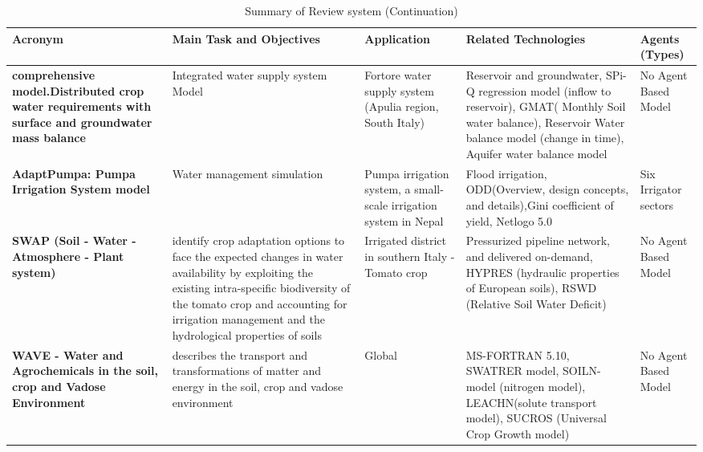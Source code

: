 \documentclass[letterpaper, 10 pt, conference]{ieeeconf}  %
\begin{document}
\newpage
\begin{table}[h]
\caption{Summary of Review system (Continuation)}
\label{table_summary1}
\begin{center}
\begin{tabular}{@{\hspace{0cm}}|p{2cm}|     @{\hspace{0cm}}|p{2cm}|   @{\hspace{0cm}} |p{4cm}|  @{\hspace{0cm}}|p{4cm}| @{\hspace{0cm}}|p{2cm}|}
\hline
\textbf{Acronym} & \textbf{Main Task and Objectives} & \textbf{Application} & \textbf{Related Technologies} & \textbf{Agents (Types)}\\
\hline
\textbf{comprehensive model.Distributed crop water requirements with surface and groundwater mass balance} \cite{Perez2016} & Integrated water supply system Model & Fortore water supply system (Apulia region, South Italy) & Reservoir and groundwater, SPi-Q regression model (inflow to reservoir), GMAT( Monthly Soil water balance), Reservoir Water balance model (change in time), Aquifer water balance model & No Agent Based Model\\
\hline
\textbf{AdaptPumpa: Pumpa Irrigation System model} \cite{Guyennon2016} & Water management simulation & Pumpa irrigation system, a small-scale irrigation system in Nepal & Flood irrigation, ODD(Overview, design concepts, and details),Gini coefficient of yield,  Netlogo 5.0 & Six Irrigator sectors\\
\hline
\textbf{SWAP (Soil - Water - Atmosphere - Plant system)} \cite{de2017adaptability} &  identify crop adaptation options to face the expected changes in water availability by exploiting the existing intra-specific biodiversity of the tomato crop and accounting for irrigation management and the hydrological properties of soils & Irrigated district in southern Italy - Tomato crop & Pressurized pipeline network, and delivered on-demand,  HYPRES (hydraulic properties of European soils), RSWD (Relative Soil Water Deficit) & No Agent Based Model\\
\hline
\textbf{WAVE - Water and Agrochemicals in the soil, crop and Vadose Environment} \cite{vanclooster1994wave} &  describes the transport and transformations of matter and energy in the soil, crop and vadose environment & Global & MS-FORTRAN 5.10, SWATRER model, SOILN-model (nitrogen model), LEACHN(solute transport model), SUCROS (Universal Crop Growth model) & No Agent Based Model\\

\end{tabular}
\end{center}
\end{table}
\end{document}
